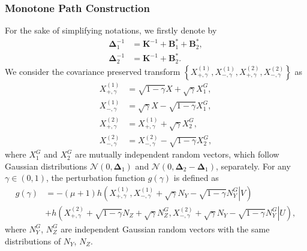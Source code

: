 \documentclass[journal,final, onecolumn]{IEEEtran}
\begin{document}
\subsubsection{Monotone Path Construction}
For the sake of simplifying notations, we firstly denote by
\begin{align}
\boldsymbol{\Delta}^{-1}_{1} &= \boldsymbol{K}^{-1} + \boldsymbol{B}_{1}^{*} + \boldsymbol{B}_{2}^{*}, \\
\boldsymbol{\Delta}^{-1}_{2} &= \boldsymbol{K}^{-1} + \boldsymbol{B}_{2}^{*}.
\end{align}
We consider the covariance preserved transform $\left\{X^{(1)}_{+,\gamma}, X^{(1)}_{-,\gamma}, X^{(2)}_{+,\gamma}, X^{(2)}_{-,\gamma} \right\}$ as
\begin{align}
X^{(1)}_{+, \gamma} &= \sqrt{1-\gamma}X + \sqrt{\gamma}X^{G}_{1}, \\
X^{(1)}_{-, \gamma} &= \sqrt{\gamma}X - \sqrt{1-\gamma}X^{G}_{1},\\
X^{(2)}_{+, \gamma} &= X^{(1)}_{+, \gamma} +  \sqrt{\gamma}X^{G}_{2},\\
X^{(2)}_{-, \gamma} &= X^{(2)}_{-, \gamma} -\sqrt{1-\gamma}X^{G}_{2},
\end{align}
where $X^{G}_{1}$ and $X^{G}_{2}$ are mutually independent random vectors, which follow Gaussian distributions $\mathcal{N}(0, \boldsymbol{\Delta}_{1})$ and $\mathcal{N}(0, \boldsymbol{\Delta}_{2}-\boldsymbol{\Delta}_{1})$, separately. For any $\gamma \in (0,1)$, the perturbation function $g(\gamma)$ is defined as
\begin{align}
g(\gamma) &= -(\mu+1)h\left(\left.X^{(1)}_{+, \gamma}, X^{(1)}_{-, \gamma}+\sqrt{\gamma}N_{Y} - \sqrt{1-\gamma}N_{Y}^{G} \right| V \right)\nonumber \\
& + h\left(\left.X^{(2)}_{+, \gamma}+\sqrt{1-\gamma}N_{Z}+ \sqrt{\gamma}N_{Z}^{G}, X^{(2)}_{-, \gamma}+\sqrt{\gamma}N_{Y} - \sqrt{1-\gamma}N_{Y}^{G} \right| U \right),
\end{align}
where $N_{Y}^{G}$, $N_{Z}^{G}$ are independent Gaussian random vectors with the same distributions of $N_{Y}$, $N_{Z}$.
\end{document}

